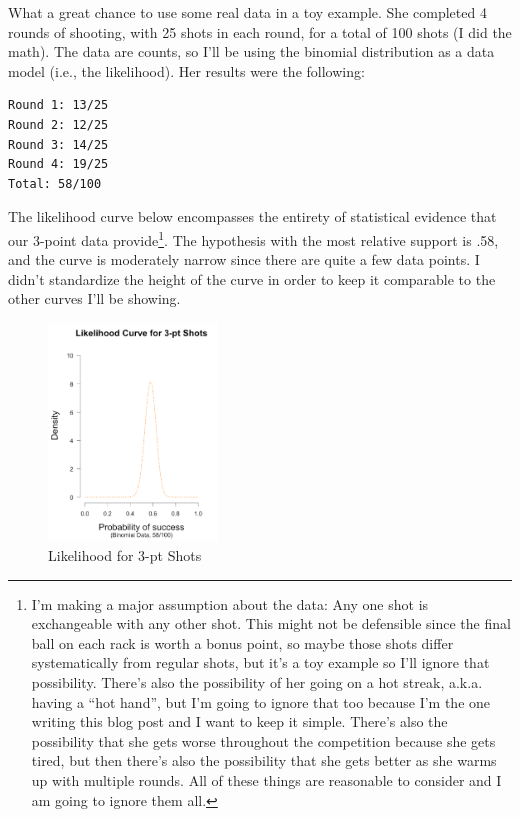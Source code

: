 What a great chance to use some real data in a toy example. She completed 4 rounds of shooting, with 25 shots in each round, for a total of 100 shots (I did the math). The data are counts, so I'll be using the binomial distribution as a data model (i.e., the likelihood). Her results were the following:
\begin{lstlisting}
Round 1: 13/25               
Round 2: 12/25               
Round 3: 14/25               
Round 4: 19/25
Total: 58/100
\end{lstlisting}
The likelihood curve below encompasses the entirety of statistical evidence that our 3-point data provide\footnote{I'm making a major assumption about the data: Any one shot is exchangeable with any other shot. This might not be defensible since the final ball on each rack is worth a bonus point, so maybe those shots differ systematically from regular shots, but it's a toy example so I'll ignore that possibility. There's also the possibility of her going on a hot streak, a.k.a. having a ``hot hand'', but I'm going to ignore that too because I'm the one writing this blog post and I want to keep it simple. There's also the possibility that she gets worse throughout the competition because she gets tired, but then there's also the possibility that she gets better as she warms up with multiple rounds. All of these things are reasonable to consider and I am going to ignore them all.}. The hypothesis with the most relative support is .58, and the curve is moderately narrow since there are quite a few data points. I didn't standardize the height of the curve in order to keep it comparable to the other curves I'll be showing.


\begin{figure}[h]
    \centering
\includegraphics[width=0.4\textwidth]{pic/p05c03-snip05.png}
    \caption{Likelihood for 3-pt Shots}
    \label{fig:p05c03-snip05}
\end{figure}

